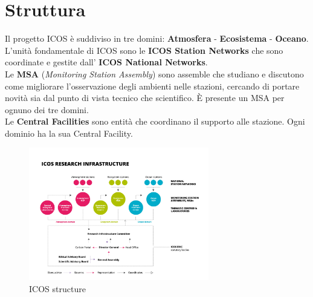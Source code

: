\section{Struttura}

Il progetto ICOS è suddiviso in tre domini: \textbf{Atmosfera} - \textbf{Ecosistema} - \textbf{Oceano}. \\

L'unità fondamentale di ICOS sono le \textbf{ICOS Station Networks} che sono coordinate e gestite dall'
\textbf{ICOS National Networks}. \\

Le \textbf{MSA} (\textit{Monitoring Station Assembly}) sono assemble che studiano e discutono come migliorare
l'osservazione degli ambienti nelle stazioni, cercando di portare novità sia dal punto di vista tecnico che scientifico.
È presente un MSA per ognuno dei tre domini. \\

Le \textbf{Central Facilities} sono entità che coordinano il supporto alle stazione. Ogni dominio ha la sua Central Facility. \\

\begin{figure}[h!]
    \caption{ICOS structure}
    \centering
    \includegraphics[width=0.7\textwidth]{figures/icos-structure.jpg}
\end{figure}